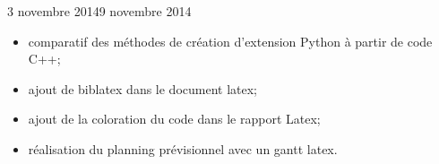 \documentclass[11pt, french, screen]{report-rd-info}
\begin{document}
\begin{fichesuivi}{3 novembre 2014}{9 novembre 2014}

	\begin{travaileffectue}
	    \begin{itemize}
	        \item comparatif des méthodes de création d'extension Python à partir de code C++;
            \item ajout de biblatex dans le document latex;
            \item ajout de la coloration du code dans le rapport Latex;
            \item réalisation du planning prévisionnel avec un gantt latex.
	    \end{itemize}
	\end{travaileffectue}

	\begin{travailnoneffectue}
	\end{travailnoneffectue}

	\begin{echange}
	\end{echange}

	\begin{planification}
	\end{planification}
\end{fichesuivi}
\end{document}
